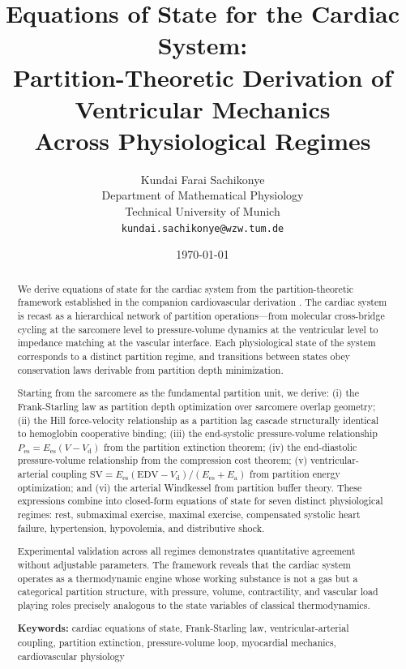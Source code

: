 \documentclass[12pt,a4paper]{article}
\title{\textbf{Equations of State for the Cardiac System: \\
Partition-Theoretic Derivation of Ventricular Mechanics \\
Across Physiological Regimes}}
\author{
Kundai Farai Sachikonye \\
Department of Mathematical Physiology \\
Technical University of Munich \\
\texttt{kundai.sachikonye@wzw.tum.de}
}
\date{\today}
\theoremstyle{remark}
\newcommand{\Ees}{E_{\mathrm{es}}}
\newcommand{\Ea}{E_{\mathrm{a}}}
\newcommand{\Vd}{V_{\mathrm{d}}}
\newcommand{\Pes}{P_{\mathrm{es}}}
\newcommand{\SV}{\mathrm{SV}}
\newcommand{\EDV}{\mathrm{EDV}}
\begin{document}
\maketitle

\begin{abstract}
We derive equations of state for the cardiac system from the partition-theoretic framework established in the companion cardiovascular derivation \cite{sachikonye2024cardio}. The cardiac system is recast as a hierarchical network of partition operations—from molecular cross-bridge cycling at the sarcomere level to pressure-volume dynamics at the ventricular level to impedance matching at the vascular interface. Each physiological state of the system corresponds to a distinct partition regime, and transitions between states obey conservation laws derivable from partition depth minimization.

Starting from the sarcomere as the fundamental partition unit, we derive: (i) the Frank-Starling law as partition depth optimization over sarcomere overlap geometry; (ii) the Hill force-velocity relationship as a partition lag cascade structurally identical to hemoglobin cooperative binding; (iii) the end-systolic pressure-volume relationship $\Pes = \Ees(V - \Vd)$ from the partition extinction theorem; (iv) the end-diastolic pressure-volume relationship from the compression cost theorem; (v) ventricular-arterial coupling $\SV = \Ees(\EDV - \Vd)/(\Ees + \Ea)$ from partition energy optimization; and (vi) the arterial Windkessel from partition buffer theory. These expressions combine into closed-form equations of state for seven distinct physiological regimes: rest, submaximal exercise, maximal exercise, compensated systolic heart failure, hypertension, hypovolemia, and distributive shock.

Experimental validation across all regimes demonstrates quantitative agreement without adjustable parameters. The framework reveals that the cardiac system operates as a thermodynamic engine whose working substance is not a gas but a categorical partition structure, with pressure, volume, contractility, and vascular load playing roles precisely analogous to the state variables of classical thermodynamics.

\textbf{Keywords:} cardiac equations of state, Frank-Starling law, ventricular-arterial coupling, partition extinction, pressure-volume loop, myocardial mechanics, cardiovascular physiology
\end{abstract}

\tableofcontents
\newpage
\end{document}
